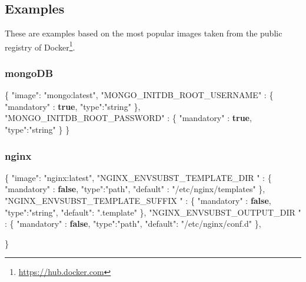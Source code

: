 \documentclass[
  11pt,
]{article}
\newenvironment{Shaded}{}{}
\newcommand{\DataTypeTok}[1]{\textcolor[rgb]{0.56,0.13,0.00}{#1}}
\newcommand{\FunctionTok}[1]{\textcolor[rgb]{0.02,0.16,0.49}{#1}}
\newcommand{\KeywordTok}[1]{\textcolor[rgb]{0.00,0.44,0.13}{\textbf{#1}}}
\newcommand{\StringTok}[1]{\textcolor[rgb]{0.25,0.44,0.63}{#1}}
\DeclareRobustCommand{\href}[2]{#2\footnote{\url{#1}}}
\begin{document}
\hypertarget{examples}{%
\subsection{Examples}\label{examples}}

These are examples based on the most popular images taken from the
public registry of \href{https://hub.docker.com}{Docker}.

\hypertarget{mongodb}{%
\subsubsection{mongoDB}\label{mongodb}}

\begin{Shaded}
\begin{Highlighting}[]
\FunctionTok{\{}
  \DataTypeTok{"image"}\FunctionTok{:} \StringTok{"mongo:latest"}\FunctionTok{,}
  \DataTypeTok{"MONGO\_INITDB\_ROOT\_USERNAME"} \FunctionTok{:} \FunctionTok{\{}
    \DataTypeTok{"mandatory"} \FunctionTok{:} \KeywordTok{true}\FunctionTok{,}
    \DataTypeTok{"type"}\FunctionTok{:}\StringTok{"string"}
  \FunctionTok{\},}
  \DataTypeTok{"MONGO\_INITDB\_ROOT\_PASSWORD"} \FunctionTok{:} \FunctionTok{\{}
    \DataTypeTok{"mandatory"} \FunctionTok{:} \KeywordTok{true}\FunctionTok{,}
    \DataTypeTok{"type"}\FunctionTok{:}\StringTok{"string"}
  \FunctionTok{\}}
\FunctionTok{\}}
\end{Highlighting}
\end{Shaded}

\hypertarget{nginx}{%
\subsubsection{nginx}\label{nginx}}

\begin{Shaded}
\begin{Highlighting}[]
\FunctionTok{\{}
  \DataTypeTok{"image"}\FunctionTok{:} \StringTok{"nginx:latest"}\FunctionTok{,}
  \DataTypeTok{"NGINX\_ENVSUBST\_TEMPLATE\_DIR "} \FunctionTok{:} \FunctionTok{\{}
    \DataTypeTok{"mandatory"} \FunctionTok{:} \KeywordTok{false}\FunctionTok{,}
    \DataTypeTok{"type"}\FunctionTok{:}\StringTok{"path"}\FunctionTok{,}
    \DataTypeTok{"default"} \FunctionTok{:} \StringTok{"/etc/nginx/templates"}
  \FunctionTok{\},}
  \DataTypeTok{"NGINX\_ENVSUBST\_TEMPLATE\_SUFFIX "} \FunctionTok{:} \FunctionTok{\{}
    \DataTypeTok{"mandatory"} \FunctionTok{:} \KeywordTok{false}\FunctionTok{,}
    \DataTypeTok{"type"}\FunctionTok{:}\StringTok{"string"}\FunctionTok{,}
    \DataTypeTok{"default"}\FunctionTok{:} \StringTok{".template"}
  \FunctionTok{\},}
  \DataTypeTok{"NGINX\_ENVSUBST\_OUTPUT\_DIR "} \FunctionTok{:} \FunctionTok{\{}
    \DataTypeTok{"mandatory"} \FunctionTok{:} \KeywordTok{false}\FunctionTok{,}
    \DataTypeTok{"type"}\FunctionTok{:}\StringTok{"path"}\FunctionTok{,}
    \DataTypeTok{"default"}\FunctionTok{:} \StringTok{"/etc/nginx/conf.d"}
  \FunctionTok{\},}

\FunctionTok{\}}
\end{Highlighting}
\end{Shaded}
\end{document}
